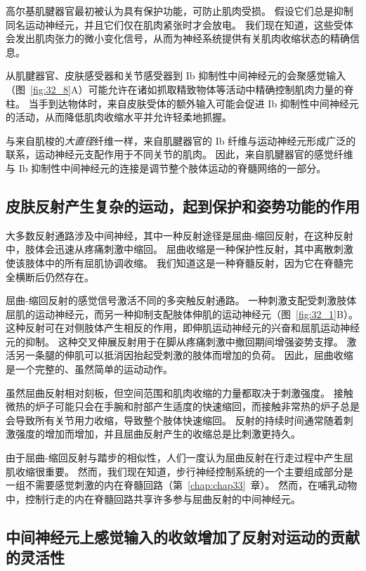 高尔基肌腱器官最初被认为具有保护功能，可防止肌肉受损。
假设它们总是抑制同名运动神经元，并且它们仅在肌肉紧张时才会放电。
我们现在知道，这些受体会发出肌肉张力的微小变化信号，从而为神经系统提供有关肌肉收缩状态的精确信息。


从肌腱器官、皮肤感受器和关节感受器到 Ib 抑制性中间神经元的会聚感觉输入（图~\ref{fig:32_8}A）可能允许在诸如抓取精致物体等活动中精确控制肌肉力量的脊柱。
当手到达物体时，来自皮肤受体的额外输入可能会促进 Ib 抑制性中间神经元的活动，从而降低肌肉收缩水平并允许轻柔地抓握。


与来自肌梭的\textit{大直径}纤维一样，来自肌腱器官的 Ib 纤维与运动神经元形成广泛的联系，运动神经元支配作用于不同关节的肌肉。
因此，来自肌腱器官的感觉纤维与 Ib 抑制性中间神经元的连接是调节整个肢体运动的脊髓网络的一部分。



\subsection{皮肤反射产生复杂的运动，起到保护和姿势功能的作用}

大多数反射通路涉及中间神经，其中一种反射途径是屈曲-缩回反射，在这种反射中，肢体会迅速从疼痛刺激中缩回。
屈曲收缩是一种保护性反射，其中离散刺激使该肢体中的所有屈肌协调收缩。
我们知道这是一种脊髓反射，因为它在脊髓完全横断后仍然存在。


屈曲-缩回反射的感觉信号激活不同的多突触反射通路。 
一种刺激支配受刺激肢体屈肌的运动神经元，而另一种抑制支配肢体伸肌的运动神经元（图~\ref{fig:32_1}B）。
这种反射可在对侧肢体产生相反的作用，即伸肌运动神经元的兴奋和屈肌运动神经元的抑制。
这种交叉伸展反射用于在脚从疼痛刺激中撤回期间增强姿势支撑。
激活另一条腿的伸肌可以抵消因抬起受刺激的肢体而增加的负荷。
因此，屈曲收缩是一个完整的、虽然简单的运动动作。


虽然屈曲反射相对刻板，但空间范围和肌肉收缩的力量都取决于刺激强度。
接触微热的炉子可能只会在手腕和肘部产生适度的快速缩回，而接触非常热的炉子总是会导致所有关节用力收缩，导致整个肢体快速缩回。
反射的持续时间通常随着刺激强度的增加而增加，并且屈曲反射产生的收缩总是比刺激更持久。


由于屈曲-缩回反射与踏步的相似性，人们一度认为屈曲反射在行走过程中产生屈肌收缩很重要。
然而，我们现在知道，步行神经控制系统的一个主要组成部分是一组不需要感觉刺激的内在脊髓回路（第~\ref{chap:chap33}~章）。
然而，在哺乳动物中，控制行走的内在脊髓回路共享许多参与屈曲反射的中间神经元。



\subsection{中间神经元上感觉输入的收敛增加了反射对运动的贡献的灵活性}

